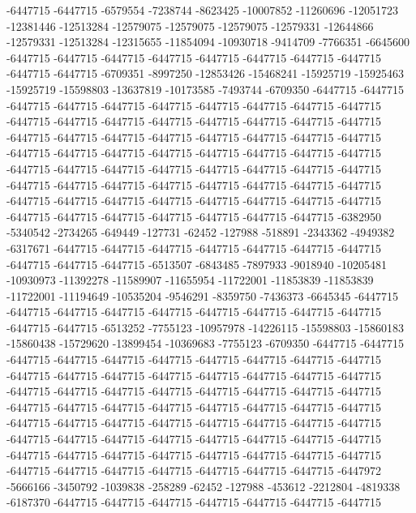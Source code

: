 -6447715 -6447715 -6579554 -7238744 -8623425 -10007852 -11260696 -12051723 -12381446 -12513284 -12579075 -12579075 -12579075 -12579331 -12644866 -12579331 -12513284 -12315655 -11854094 -10930718 -9414709 -7766351 -6645600 -6447715 -6447715 -6447715 -6447715 -6447715 -6447715 -6447715 -6447715 -6447715 -6447715 -6709351 -8997250 -12853426 -15468241 -15925719 -15925463 -15925719 -15598803 -13637819 -10173585 -7493744 -6709350 -6447715 -6447715 -6447715 -6447715 -6447715 -6447715 -6447715 -6447715 -6447715 -6447715 -6447715 -6447715 -6447715 -6447715 -6447715 -6447715 -6447715 -6447715 -6447715 -6447715 -6447715 -6447715 -6447715 -6447715 -6447715 -6447715 -6447715 -6447715 -6447715 -6447715 -6447715 -6447715 -6447715 -6447715 -6447715 -6447715 -6447715 -6447715 -6447715 -6447715 -6447715 -6447715 -6447715 -6447715 -6447715 -6447715 -6447715 -6447715 -6447715 -6447715 -6447715 -6447715 -6447715 -6447715 -6447715 -6447715 -6447715 -6447715 -6447715 -6447715 -6447715 -6447715 -6447715 -6447715 -6447715 -6382950 -5340542 -2734265 -649449 -127731 -62452 -127988 -518891 -2343362 -4949382 -6317671 -6447715 -6447715 -6447715 -6447715 -6447715 -6447715 -6447715
-6447715 -6447715 -6447715 -6513507 -6843485 -7897933 -9018940 -10205481 -10930973 -11392278 -11589907 -11655954 -11722001 -11853839 -11853839 -11722001 -11194649 -10535204 -9546291 -8359750 -7436373 -6645345 -6447715 -6447715 -6447715 -6447715 -6447715 -6447715 -6447715 -6447715 -6447715 -6447715 -6447715 -6513252 -7755123 -10957978 -14226115 -15598803 -15860183 -15860438 -15729620 -13899454 -10369683 -7755123 -6709350 -6447715 -6447715 -6447715 -6447715 -6447715 -6447715 -6447715 -6447715 -6447715 -6447715 -6447715 -6447715 -6447715 -6447715 -6447715 -6447715 -6447715 -6447715 -6447715 -6447715 -6447715 -6447715 -6447715 -6447715 -6447715 -6447715 -6447715 -6447715 -6447715 -6447715 -6447715 -6447715 -6447715 -6447715 -6447715 -6447715 -6447715 -6447715 -6447715 -6447715 -6447715 -6447715 -6447715 -6447715 -6447715 -6447715 -6447715 -6447715 -6447715 -6447715 -6447715 -6447715 -6447715 -6447715 -6447715 -6447715 -6447715 -6447715 -6447715 -6447715 -6447715 -6447715 -6447715 -6447715 -6447715 -6447972 -5666166 -3450792 -1039838 -258289 -62452 -127988 -453612 -2212804 -4819338 -6187370 -6447715 -6447715 -6447715 -6447715 -6447715 -6447715 -6447715
